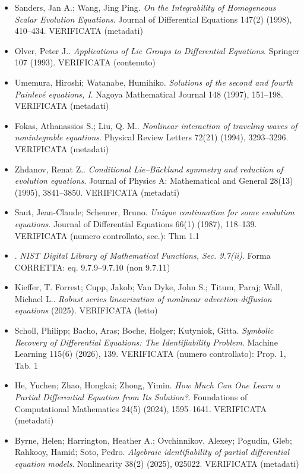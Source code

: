 \documentclass[11pt]{article}
\theoremstyle{plain}
\theoremstyle{definition}
\theoremstyle{remark}
\begin{document}
\begin{itemize}[itemsep=2pt,leftmargin=1.2em,font=\small]
\item Sanders, Jan A.; Wang, Jing Ping. \emph{On the Integrability of Homogeneous Scalar Evolution Equations}. Journal of Differential Equations 147(2) (1998), 410--434. \textsf{\footnotesize VERIFICATA (metadati)}
\item Olver, Peter J.. \emph{Applications of Lie Groups to Differential Equations}. Springer 107 (1993). \textsf{\footnotesize VERIFICATA (contenuto)}
\item Umemura, Hiroshi; Watanabe, Humihiko. \emph{Solutions of the second and fourth {P}ainlev{\'e} equations, {I}}. Nagoya Mathematical Journal 148 (1997), 151--198. \textsf{\footnotesize VERIFICATA (metadati)}
\item Fokas, Athanassios S.; Liu, Q. M.. \emph{Nonlinear interaction of traveling waves of nonintegrable equations}. Physical Review Letters 72(21) (1994), 3293--3296. \textsf{\footnotesize VERIFICATA (metadati)}
\item Zhdanov, Renat Z.. \emph{Conditional {L}ie--{B}{\"a}cklund symmetry and reduction of evolution equations}. Journal of Physics A: Mathematical and General 28(13) (1995), 3841--3850. \textsf{\footnotesize VERIFICATA (metadati)}
\item Saut, Jean-Claude; Scheurer, Bruno. \emph{Unique continuation for some evolution equations}. Journal of Differential Equations 66(1) (1987), 118--139. \textsf{\footnotesize VERIFICATA (numero controllato, sec.): Thm 1.1}
\item . \emph{{NIST} Digital Library of Mathematical Functions, Sec. 9.7(ii)}. \textsf{\footnotesize Forma CORRETTA: eq. 9.7.9--9.7.10 (non 9.7.11)}
\item Kieffer, T. Forrest; Cupp, Jakob; Van Dyke, John S.; Titum, Paraj; Wall, Michael L.. \emph{Robust series linearization of nonlinear advection-diffusion equations} (2025). \textsf{\footnotesize VERIFICATA (letto)}
\item Scholl, Philipp; Bacho, Aras; Boche, Holger; Kutyniok, Gitta. \emph{Symbolic Recovery of Differential Equations: The Identifiability Problem}. Machine Learning 115(6) (2026), 139. \textsf{\footnotesize VERIFICATA (numero controllato): Prop. 1, Tab. 1}
\item He, Yuchen; Zhao, Hongkai; Zhong, Yimin. \emph{How Much Can One Learn a Partial Differential Equation from Its Solution?}. Foundations of Computational Mathematics 24(5) (2024), 1595--1641. \textsf{\footnotesize VERIFICATA (metadati)}
\item Byrne, Helen; Harrington, Heather A.; Ovchinnikov, Alexey; Pogudin, Gleb; Rahkooy, Hamid; Soto, Pedro. \emph{Algebraic identifiability of partial differential equation models}. Nonlinearity 38(2) (2025), 025022. \textsf{\footnotesize VERIFICATA (metadati)}

\end{itemize}
\end{document}

